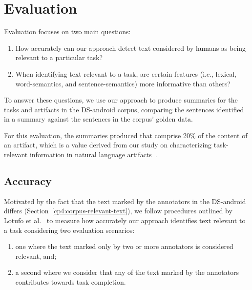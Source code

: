 \section{Evaluation}
\label{cp5:evaluation}


Evaluation focuses on two main questions:

\begin{enumerate}
    \item How accurately can our approach detect text considered by humans as being relevant to a particular task?
    
    \item When identifying text relevant to a task, are certain features (i.e., lexical, word-semantics, and sentence-semantics) more informative than others?
\end{enumerate}


To answer these questions, we use our approach to produce summaries for 
the tasks and artifacts in the \acs{DS-android} corpus,
comparing the sentences identified in a summary against the 
sentences in the corpus' golden data. 

For this evaluation, the summaries produced that comprise 20\% of the content of an artifact,
which is a value derived from our study on characterizing 
task-relevant information in natural language artifacts~\cite{marques2020}.






\subsection{Accuracy}





Motivated by the fact that the text marked by the annotators in the \acs{DS-android} differs
(Section~\ref{cp4:corpus-relevant-text}),
we follow procedures outlined by Lotufo et al.~\cite{Lotufo2012}
to measure how accurately our approach identifies text relevant to a task considering two evaluation scenarios:


\begin{enumerate}
    \item one where the text marked only by two or more annotators is considered relevant, and;
    
    \item a second where we consider that any of the text marked by the annotators contributes towards task completion.
\end{enumerate}



